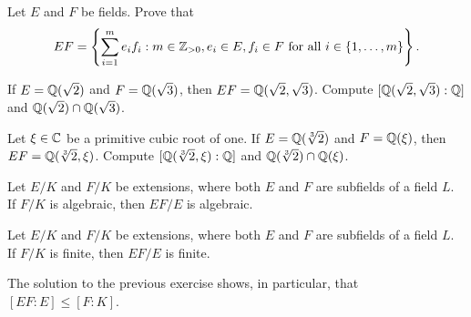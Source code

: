 \begin{exercise}
    Let $E$ and $F$ be fields. 
    Prove that 
    \[
    EF=\left\{\sum_{i=1}^me_if_i:m\in\mathbb{Z}_{>0},e_i\in E,f_i\in F\text{ for all $i\in\{1,\dots,m\}$}\right\}.
    \]
\end{exercise}

\begin{exercise}
    If $E=\mathbb{Q}(\sqrt{2})$ and $F=\mathbb{Q}(\sqrt{3})$, then $EF=\mathbb{Q}(\sqrt{2},\sqrt{3})$. 
    Compute $[\mathbb{Q}(\sqrt{2},\sqrt{3}):\mathbb{Q}]$ and 
    $\mathbb{Q}(\sqrt{2})\cap\mathbb{Q}(\sqrt{3})$. 
\end{exercise}

\begin{exercise}
    Let $\xi\in\mathbb{C}$ be a primitive cubic root of one. 
    If $E=\mathbb{Q}(\sqrt[3]{2})$ and $F=\mathbb{Q}(\xi)$, then $EF=\mathbb{Q}(\sqrt[3]{2},\xi)$. 
    Compute $[\mathbb{Q}(\sqrt[3]{2},\xi):\mathbb{Q}]$ and 
    $\mathbb{Q}(\sqrt[3]{2})\cap\mathbb{Q}(\xi)$. 
\end{exercise}

\begin{exercise}
	Let $E/K$ and $F/K$ be extensions, where both $E$ and $F$ are subfields of 
	a field $L$. If $F/K$ is algebraic, then $EF/E$ is algebraic.
\end{exercise}


\begin{exercise}
	Let $E/K$ and $F/K$ be extensions, where both $E$ and $F$ are subfields of 
	a field $L$. If $F/K$ is finite, then $EF/E$ is finite.
\end{exercise}

The solution to the previous exercise shows, in particular, that $[EF:E]\leq [F:K]$. 
